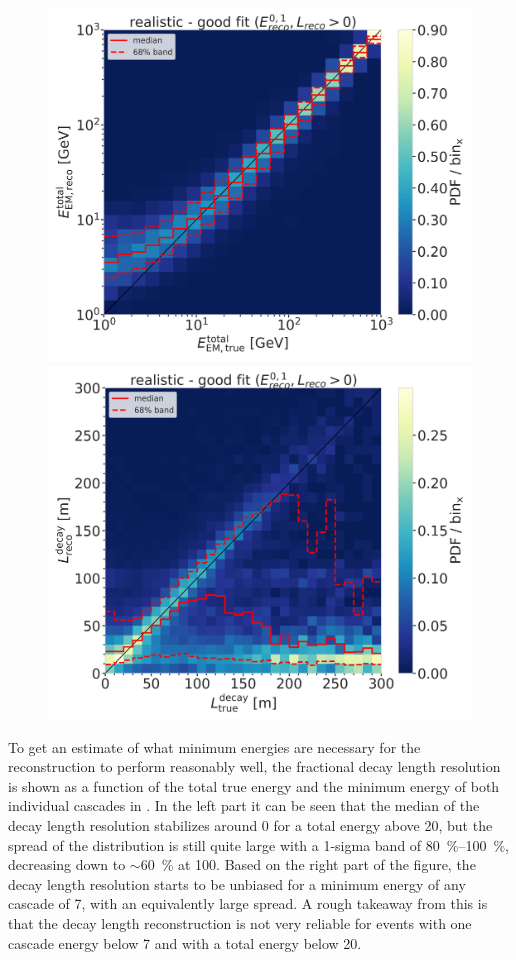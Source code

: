 \begin{figure}[h]
	\centering
    \includegraphics[width=0.49\linewidth]{figures/model_independent_simulation/results/realistic/2d_hists/194603_reco_total_energy_vs_true_total_energy_goodfit_step_contours.png}
    \includegraphics[width=0.49\linewidth]{figures/model_independent_simulation/results/realistic/2d_hists/194603_reco_decay_length_vs_true_decay_length_goodfit_step_contours.png}
    \caption[]{}
\end{figure}

To get an estimate of what minimum energies are necessary for the reconstruction to perform reasonably well, the fractional decay length resolution is shown as a function of the total true energy and the minimum energy of both individual cascades in . In the left part it can be seen that the median of the decay length resolution stabilizes around 0 for a total energy above \SI{20}{\gev}, but the spread of the distribution is still quite large with a 1-sigma band of \SIrange{80}{100}{\percent}, decreasing down to $\sim$\SI{60}{\percent} at \SI{100}{\gev}. Based on the right part of the figure, the decay length resolution starts to be unbiased for a minimum energy of any cascade of \SI{7}{\gev}, with an equivalently large spread. A rough takeaway from this is that the decay length reconstruction is not very reliable for events with one cascade energy below \SI{7}{\gev} and with a total energy below \SI{20}{\gev}. 

